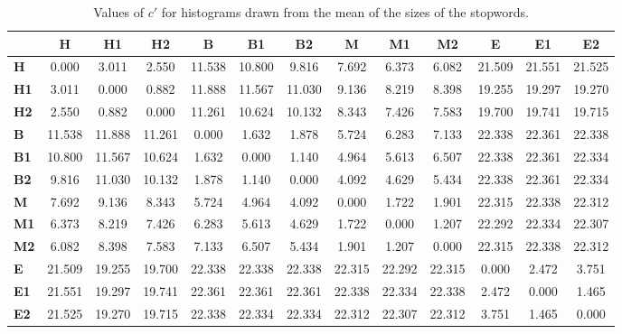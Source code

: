 \begin{table*}[h!]
\begin{center}
\begin{tabular}{| l || c | c | c || c | c | c || c | c | c || c | c | c |}\hline
 & {\bf H} & {\bf H1} & {\bf H2} & {\bf B} & {\bf B1} & {\bf B2} & {\bf M} & {\bf M1} & {\bf M2} & {\bf E} & {\bf E1} & {\bf E2} \\\hline\hline
{\bf H} & 0.000 & 3.011 & 2.550 & 11.538 & 10.800 & 9.816 & 7.692 & 6.373 & 6.082 & 21.509 & 21.551 & 21.525 \\\hline
{\bf H1} & 3.011 & 0.000 & 0.882 & 11.888 & 11.567 & 11.030 & 9.136 & 8.219 & 8.398 & 19.255 & 19.297 & 19.270 \\\hline
{\bf H2} & 2.550 & 0.882 & 0.000 & 11.261 & 10.624 & 10.132 & 8.343 & 7.426 & 7.583 & 19.700 & 19.741 & 19.715 \\\hline\hline
{\bf B} & 11.538 & 11.888 & 11.261 & 0.000 & 1.632 & 1.878 & 5.724 & 6.283 & 7.133 & 22.338 & 22.361 & 22.338 \\\hline
{\bf B1} & 10.800 & 11.567 & 10.624 & 1.632 & 0.000 & 1.140 & 4.964 & 5.613 & 6.507 & 22.338 & 22.361 & 22.334 \\\hline
{\bf B2} & 9.816 & 11.030 & 10.132 & 1.878 & 1.140 & 0.000 & 4.092 & 4.629 & 5.434 & 22.338 & 22.361 & 22.334 \\\hline\hline
{\bf M} & 7.692 & 9.136 & 8.343 & 5.724 & 4.964 & 4.092 & 0.000 & 1.722 & 1.901 & 22.315 & 22.338 & 22.312 \\\hline
{\bf M1} & 6.373 & 8.219 & 7.426 & 6.283 & 5.613 & 4.629 & 1.722 & 0.000 & 1.207 & 22.292 & 22.334 & 22.307 \\\hline
{\bf M2} & 6.082 & 8.398 & 7.583 & 7.133 & 6.507 & 5.434 & 1.901 & 1.207 & 0.000 & 22.315 & 22.338 & 22.312 \\\hline\hline
{\bf E} & 21.509 & 19.255 & 19.700 & 22.338 & 22.338 & 22.338 & 22.315 & 22.292 & 22.315 & 0.000 & 2.472 & 3.751 \\\hline
{\bf E1} & 21.551 & 19.297 & 19.741 & 22.361 & 22.361 & 22.361 & 22.338 & 22.334 & 22.338 & 2.472 & 0.000 & 1.465 \\\hline
{\bf E2} & 21.525 & 19.270 & 19.715 & 22.338 & 22.334 & 22.334 & 22.312 & 22.307 & 22.312 & 3.751 & 1.465 & 0.000 \\\hline
\end{tabular}
\caption{Values of $c'$ for histograms drawn from the mean of the sizes of the stopwords.}
\end{center}
\end{table*}